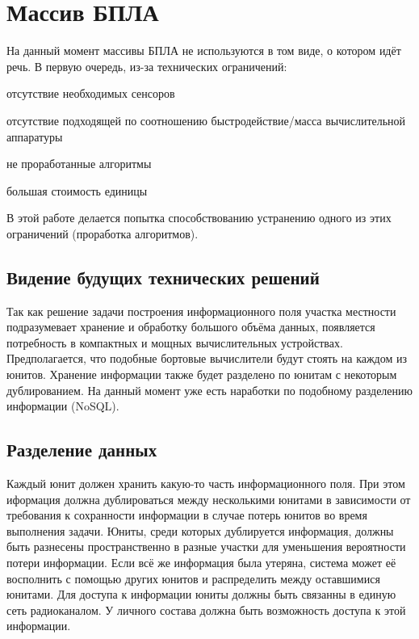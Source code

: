 \newpage
\section{Массив БПЛА}

На данный момент массивы БПЛА не используются в том виде,
о котором идёт речь. В первую очередь, из-за технических
ограничений: 
\begin{mintemize}
    \item отсутствие необходимых сенсоров
    \item отсутствие подходящей по соотношению быстродействие/масса
        вычислительной аппаратуры
    \item не проработанные алгоритмы
    \item большая стоимость единицы
\end{mintemize}

В этой работе делается попытка способствованию
устранению одного из этих ограничений (проработка алгоритмов).

\subsection{Видение будущих технических решений}

Так как решение задачи построения информационного поля
участка местности подразумевает хранение и обработку большого объёма
данных, появляется потребность в компактных и мощных вычислительных
устройствах. Предполагается, что подобные бортовые вычислители будут
стоять на каждом из юнитов. Хранение информации также будет
разделено по юнитам с некоторым дублированием. На данный момент уже
есть наработки по подобному разделению информации (NoSQL).

\subsection{Разделение данных}

Каждый юнит должен хранить какую-то часть информационного поля.
При этом иформация должна дублироваться между несколькими юнитами в
зависимости от требования к сохранности информации в случае потерь
юнитов во время выполнения задачи. Юниты, среди которых дублируется
информация, должны быть разнесены пространственно в разные участки
для уменьшения вероятности потери информации. Если всё же информация
была утеряна, система может её восполнить с помощью других юнитов и 
распределить между оставшимися юнитами. Для доступа к информации юниты
должны быть связанны в единую сеть радиоканалом. У личного состава
должна быть возможность доступа к этой информации. 

